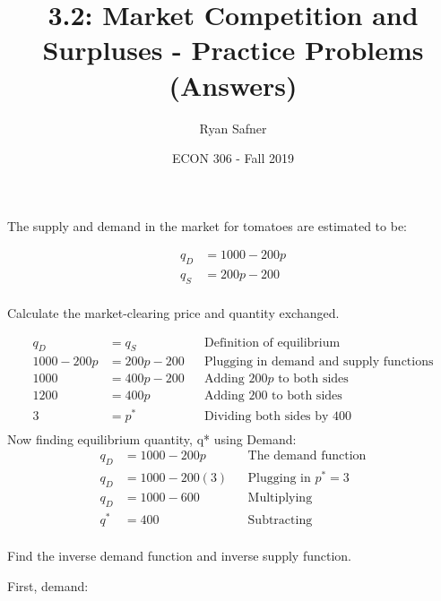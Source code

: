 \documentclass[12 pt]{exam}
\title{3.2: Market Competition and Surpluses - Practice Problems (Answers)}
\author{Ryan Safner}
\date{ECON 306 - Fall 2019}
\begin{document}
\maketitle

The supply and demand in the market for tomatoes are estimated to be:

$$\begin{aligned}
q_D&=1000-200p\\
q_S&=200p-200\\ \end{aligned}$$

\begin{questions}

\question Calculate the market-clearing price and quantity exchanged.

\begin{solution}
	\begin{align*}
	q_D&=q_S && \text{Definition of equilibrium}\\
	1000-200p&=200p-200 && \text{Plugging in demand and supply functions}\\
	1000&=400p-200 && \text{Adding } 200p \text{ to both sides}\\
	1200&=400p && \text{Adding } 200 \text{ to both sides}\\
	3&=p^* && \text{Dividing both sides by }400\\
	\end{align*}
	Now finding equilibrium quantity, q* using Demand: 
	\begin{align*}
	q_D&=1000-200p && \text{The demand function}\\
	q_D&=1000-200(3) && \text{Plugging in } p^*=3	\\
	q_D&=1000-600 && \text{Multiplying}\\
	q^*&=400 && \text{Subtracting}\\
	\end{align*}

\end{solution}

\question Find the inverse demand function and inverse supply function.

\begin{solution}

First, demand:


\end{solution}
\end{questions}
\end{document}
